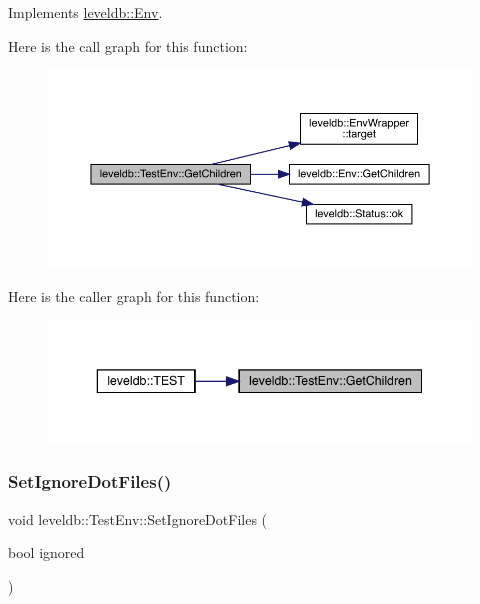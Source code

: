 Implements \mbox{\hyperlink{classleveldb_1_1_env_a53028e3112d7bb3bf6574ddaab18d6f6}{leveldb\+::\+Env}}.

Here is the call graph for this function\+:
\nopagebreak
\begin{figure}[H]
\begin{center}
\leavevmode
\includegraphics[width=350pt]{classleveldb_1_1_test_env_ac0ab9af039ce4ca277c3df2b437821a7_cgraph}
\end{center}
\end{figure}
Here is the caller graph for this function\+:
\nopagebreak
\begin{figure}[H]
\begin{center}
\leavevmode
\includegraphics[width=343pt]{classleveldb_1_1_test_env_ac0ab9af039ce4ca277c3df2b437821a7_icgraph}
\end{center}
\end{figure}
\mbox{\label{classleveldb_1_1_test_env_a53f3533febb86f9c1d424ce329a74bf9}} 
\subsubsection{\texorpdfstring{SetIgnoreDotFiles()}{SetIgnoreDotFiles()}}
{\footnotesize\ttfamily void leveldb\+::\+Test\+Env\+::\+Set\+Ignore\+Dot\+Files (\begin{DoxyParamCaption}\item[{bool}]{ignored }\end{DoxyParamCaption})\hspace{0.3cm}{\ttfamily [inline]}}


